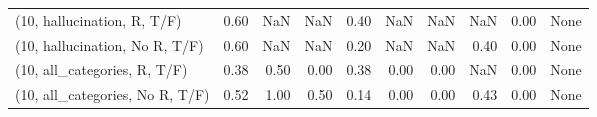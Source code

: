 \begin{table*}[h!]
\begin{adjustbox}{width=2\columnwidth,center}
\begin{tabular}{lrrr|rrr|rrr}
(10, hallucination, R, T/F)           &                      0.60 &                   NaN &                       NaN &                          0.40 &                       NaN &                           NaN &                                    NaN &                               0.00 &                                  None \\
(10, hallucination, No R, T/F)        &                      0.60 &                   NaN &                       NaN &                          0.20 &                       NaN &                           NaN &                                   0.40 &                               0.00 &                                  None \\
(10, all\_categories, R, T/F)          &                      0.38 &                  0.50 &                      0.00 &                          0.38 &                      0.00 &                          0.00 &                                    NaN &                               0.00 &                                  None \\
(10, all\_categories, No R, T/F)       &                      0.52 &                  1.00 &                      0.50 &                          0.14 &                      0.00 &                          0.00 &                                   0.43 &                               0.00 &                                  None \\




\end{tabular}
\end{adjustbox}
\end{table*}
